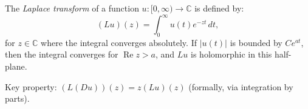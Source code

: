 The \textit{Laplace transform} of a function $u: [0, \infty) \to \mathbb{C}$ is defined by:
\[
(Lu)(z) = \int_0^\infty u(t) e^{-zt} \, dt,
\]
for $z \in \mathbb{C}$ where the integral converges absolutely. If $|u(t)|$ is bounded by $Ce^{at}$, then the integral converges for $\operatorname{Re} z > a$, and $Lu$ is holomorphic in this half-plane.

Key property: $(L(Du))(z) = z (Lu)(z)$ (formally, via integration by parts).

